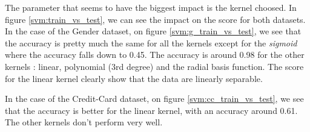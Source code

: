 \documentclass[10pt]{article}
\begin{document}
			The parameter that seems to have the biggest impact is the kernel choosed.
			In figure \ref{svm:train_vs_test}, we can see the impact on the score for both datasets. In the case of the Gender dataset, on figure \ref{svm:g_train_vs_test}, we see that the accuracy is pretty much the same for all the kernels except for the \textit{sigmoid} where the accuracy falls down to 0.45. The accuracy is around 0.98 for the other kernels : linear, polynomial (3rd degree) and the radial basis function. The score for the linear kernel clearly show that the data are linearly separable.

			In the case of the Credit-Card dataset, on figure \ref{svm:cc_train_vs_test}, we see that the accuracy is better for the linear kernel, with an accuracy around 0.61. The other kernels don't perform very well.
\end{document}
